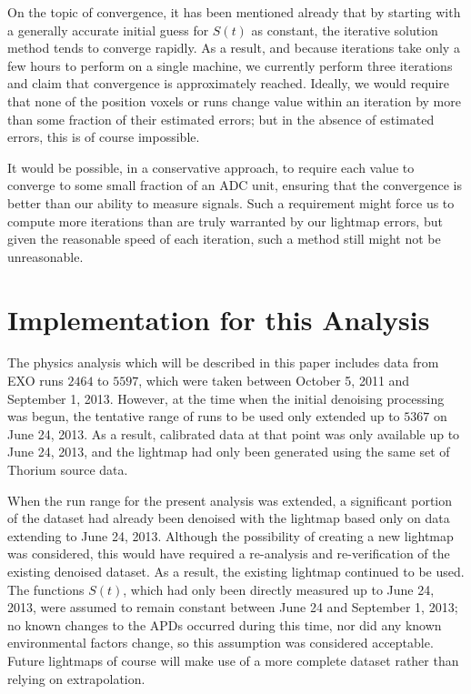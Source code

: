On the topic of convergence, it has been mentioned already that by starting with a generally accurate initial guess for $S(t)$ as constant, the iterative solution method tends to converge rapidly.  As a result, and because iterations take only a few hours to perform on a single machine, we currently perform three iterations and claim that convergence is approximately reached.  Ideally, we would require that none of the position voxels or runs change value within an iteration by more than some fraction of their estimated errors; but in the absence of estimated errors, this is of course impossible.

It would be possible, in a conservative approach, to require each value to converge to some small fraction of an ADC unit, ensuring that the convergence is better than our ability to measure signals.  Such a requirement might force us to compute more iterations than are truly warranted by our lightmap errors, but given the reasonable speed of each iteration, such a method still might not be unreasonable.

\section{Implementation for this Analysis}

The physics analysis which will be described in this paper includes data from EXO runs $2464$ to $5597$, which were taken between October 5, 2011 and September 1, 2013.  However, at the time when the initial denoising processing was begun, the tentative range of runs to be used only extended up to $5367$ on June 24, 2013.  As a result, calibrated data at that point was only available up to June 24, 2013, and the lightmap had only been generated using the same set of Thorium source data.

When the run range for the present analysis was extended, a significant portion of the dataset had already been denoised with the lightmap based only on data extending to June 24, 2013.  Although the possibility of creating a new lightmap was considered, this would have required a re-analysis and re-verification of the existing denoised dataset.  As a result, the existing lightmap continued to be used.  The functions $S(t)$, which had only been directly measured up to June 24, 2013, were assumed to remain constant between June 24 and September 1, 2013; no known changes to the APDs occurred during this time, nor did any known environmental factors change, so this assumption was considered acceptable.  Future lightmaps of course will make use of a more complete dataset rather than relying on extrapolation.

